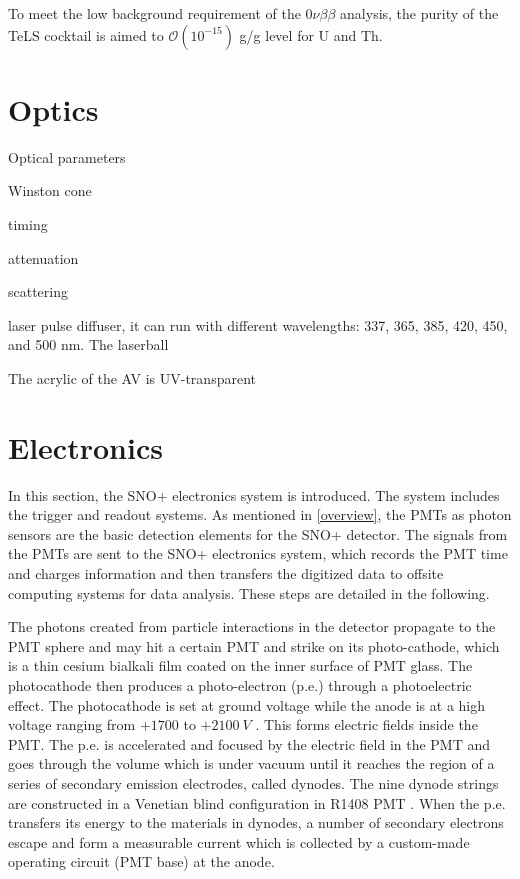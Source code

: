 To meet the low background requirement of the $0\nu\beta\beta$ analysis, the purity of the TeLS cocktail is aimed to $\mathcal{O}(10^{-15})$ g/g level for U and Th. 





\section{Optics}

Optical parameters

Winston cone



timing


attenuation

scattering


laser pulse diffuser, it can run with different wavelengths: 337, 365, 385, 420, 450, and 500 nm.
The laserball 

The acrylic of the AV is UV-transparent

\section{Electronics}
In this section, the SNO+ electronics system is introduced. The system includes the trigger and readout systems. As mentioned in \ref{overview}, the PMTs as photon sensors are the basic detection elements for the SNO+ detector. The signals from the PMTs are sent to the SNO+ electronics system, which records the PMT time and charges information and then transfers the digitized data to offsite computing systems for data analysis. These steps are detailed in the following.

The photons created from particle interactions in the detector propagate to the PMT sphere and may hit a certain PMT and strike on its photo-cathode, which is a thin cesium bialkali film coated on the inner surface of PMT glass. The photocathode then produces a photo-electron (p.e.) through a photoelectric effect. The photocathode is set at ground voltage while the anode is at a high voltage ranging from $+1700$ to $+2100~V$ \cite{boger2000sudbury,dunger2018topological}. This forms electric fields inside the PMT. The p.e. is accelerated and focused by the electric field in the PMT and goes through the volume which is under vacuum until it reaches the region of a series of secondary emission electrodes, called dynodes. The nine dynode strings are constructed in a Venetian blind configuration in R1408 PMT \cite{boger2000sudbury,leo2012techniques}. When the p.e. transfers its energy to the materials in dynodes, a number of secondary electrons escape and form a measurable current which is collected by a custom-made operating circuit (PMT base) at the anode\cite{hamamatsu2018photomultiplier}.


